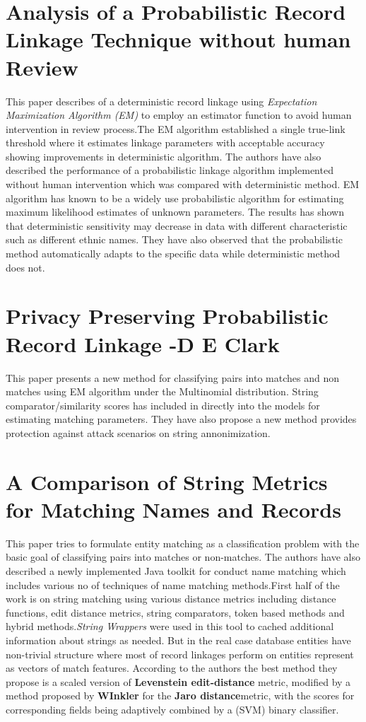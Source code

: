 \documentclass[a4paper]{article}
\begin{document}
\newpage

\section*{Analysis of a Probabilistic Record Linkage Technique without human Review}
This paper \cite{Grannis2003} describes of a deterministic record linkage using \textit{Expectation Maximization Algorithm (EM)} to employ an estimator function to avoid human intervention in review process.The EM algorithm established a single true-link threshold where it estimates linkage parameters with acceptable accuracy showing improvements in deterministic algorithm. The authors have also described the performance of a probabilistic linkage algorithm implemented without human intervention which was compared with deterministic method. EM algorithm has known to be a widely use probabilistic algorithm for estimating maximum likelihood estimates of unknown parameters. The results has shown that deterministic sensitivity may decrease in data with different characteristic such as different ethnic names. They have also observed that the probabilistic method automatically adapts to the specific data while deterministic method does not.

\section*{Privacy Preserving Probabilistic Record Linkage -D E Clark }
This paper presents a new method for classifying pairs into matches and non matches using EM algorithm under the Multinomial distribution. String comparator/similarity scores has included in directly into the models for estimating matching parameters. They have also propose a new method provides protection against attack scenarios on string annonimization.

\section*{A Comparison of String Metrics for Matching Names and Records}
This paper \cite{Cohen2003ARecords} tries to formulate entity matching as a classification problem with the basic goal of classifying pairs into matches or non-matches. The authors have also described a newly implemented Java toolkit for conduct name matching which includes various no of techniques of name matching methods.First half of the work is on string matching using various distance metrics including distance functions, edit distance metrics, string comparators, token based methods and hybrid methods.\textit{String Wrappers} were used in this tool to cached additional information about strings as needed. But in the real case database entities have non-trivial structure where most of record linkages perform on entities represent as vectors of match features. According to the authors the best method they propose is a scaled version of \textbf{Levenstein edit-distance} metric, modified by a method proposed by \textbf{WInkler} for the \textbf{Jaro distance}metric, with the scores for corresponding fields being adaptively combined by a (SVM) binary classifier.
\end{document}
